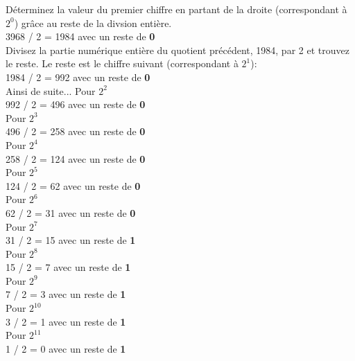 \begin{Exercice}[20 minutes]
\begin{solution}
        
        Déterminez la valeur du premier chiffre en partant de la droite (correspondant à $2^0$) grâce au reste de la divsion entière.\\
        3968 / 2 = 1984 avec un reste de \textbf{0}\\
        Divisez la partie numérique entière du quotient précédent, 1984, par 2 et trouvez le reste. Le reste est le chiffre suivant (correspondant à $2^1$):\\
        1984 / 2 = 992 avec un reste de \textbf{0}\\
        Ainsi de suite... Pour $2^2$\\
        992 / 2 = 496 avec un reste de \textbf{0}\\
        Pour $2^3$\\
        496 / 2 = 258 avec un reste de \textbf{0}\\
        Pour $2^4$\\
        258 / 2 = 124 avec un reste de \textbf{0}\\
        Pour $2^5$\\
        124 / 2 = 62 avec un reste de \textbf{0}\\
        Pour $2^6$\\
        62 / 2 = 31 avec un reste de \textbf{0}\\
        Pour $2^7$\\
        31 / 2 = 15 avec un reste de \textbf{1}\\
        Pour $2^8$\\
        15 / 2 = 7 avec un reste de \textbf{1}\\
        Pour $2^9$\\
        7 / 2 = 3 avec un reste de \textbf{1}\\
        Pour $2^10$\\
        3 / 2 = 1 avec un reste de \textbf{1}\\
        Pour $2^11$\\
        1 / 2 = 0 avec un reste de \textbf{1}\\\\


\end{solution}
\end{Exercice}
